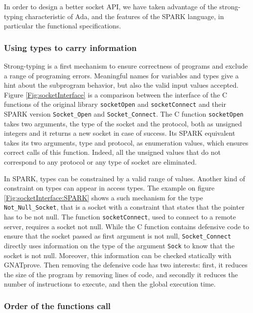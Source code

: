 \documentclass[runningheads]{llncs}
\begin{document}
    In order to design a better socket API, we have taken advantage of the strong-typing characteristic of Ada,
    and the features of the SPARK language, in particular the functional specifications.

\subsubsection{Using types to carry information}

    Strong-typing is a first mechanism to ensure correctness of programs and exclude a range of programing errors. Meaningful names for
    variables and types give a hint about the subprogram behavior, but also the valid input values accepted.
    Figure \ref{Fig:socketInterface} is a comparison between the interface of the C functions of the original library
    \lstinline{socketOpen} and \lstinline{socketConnect} and their SPARK version \lstinline{Socket_Open} and
    \lstinline{Socket_Connect}. The C function \lstinline{socketOpen} takes two arguments, the type of the socket and the protocol,
    both as unsigned integers and it returns a new socket in case of success.
    Its SPARK equivalent takes its two arguments, type and protocol, as enumeration values, which ensures correct calls
    of this function. Indeed, all the unsigned values that do not correspond to any protocol or any type of socket are eliminated.

    In SPARK, types can be constrained by a valid range of values. Another kind of constraint on types can appear in
    access types. The example on figure \ref{Fig:socketInterface:SPARK} shows a such mechanism for the type \lstinline{Not_Null_Socket},
    that is a socket with a constraint that states that the pointer has to be not null. The function \lstinline{socketConnect},
    used to connect to a remote server, requires a socket not null. While the C function contains defensive code to ensure that
    the socket passed as first argument is not null, \lstinline{Socket_Connect} directly uses information on the type of the argument
    \lstinline{Sock} to know that the socket is not null. Moreover, this information can be checked statically with GNATprove.
    Then removing the defensive code has two interests: first, it reduces the size of the program by removing lines of code,
    and secondly it reduces the number of instructions to execute, and then the global execution time.


\subsubsection{Order of the functions call}
\end{document}
